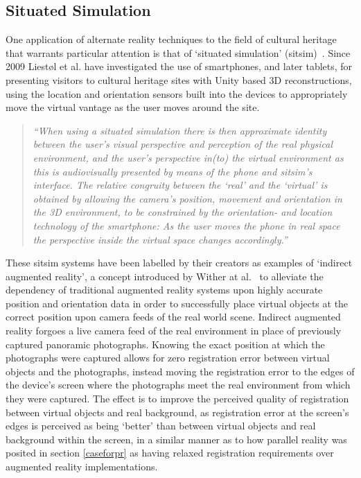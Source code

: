 \subsection{Situated Simulation}
\label{situated-simulation}
One application of alternate reality techniques to the field of cultural heritage that warrants particular attention is that of `situated simulation' (sitsim)~\cite{Liestøl2009}. Since 2009 Liest\o l et al. have investigated the use of smartphones, and later tablets, for presenting visitors to cultural heritage sites with Unity based 3D reconstructions, using the location and orientation sensors built into the devices to appropriately move the virtual vantage as the user moves around the site.

\begin{quote}
	\textit{``When using a situated simulation there is then approximate identity between the user’s visual perspective and perception of the real physical environment, and the user’s perspective in(to) the virtual environment as this is audiovisually presented by means of the phone and sitsim’s interface. The relative congruity between the `real' and the `virtual' is obtained by allowing the camera’s position, movement and orientation in the 3D environment, to be constrained by the orientation- and location technology of the smartphone: As the user moves the phone in real space the perspective inside the virtual space changes accordingly.''}~\cite{Liestøl2011}
\end{quote}

These sitsim systems have been labelled by their creators as examples of `indirect augmented reality', a concept introduced by Wither at al.~\cite{Wither2011} to alleviate the dependency of traditional augmented reality systems upon highly accurate position and orientation data in order to successfully place virtual objects at the correct position upon camera feeds of the real world scene. Indirect augmented reality forgoes a live camera feed of the real environment in place of previously captured panoramic photographs. Knowing the exact position at which the photographs were captured allows for zero registration error between virtual objects and the photographs, instead moving the registration error to the edges of the device's screen where the photographs meet the real environment from which they were captured. The effect is to improve the perceived quality of registration between virtual objects and real background, as registration error at the screen's edges is perceived as being `better' than between virtual objects and real background within the screen, in a similar manner as to how parallel reality was posited in section \ref{caseforpr} as having relaxed registration requirements over augmented reality implementations.

